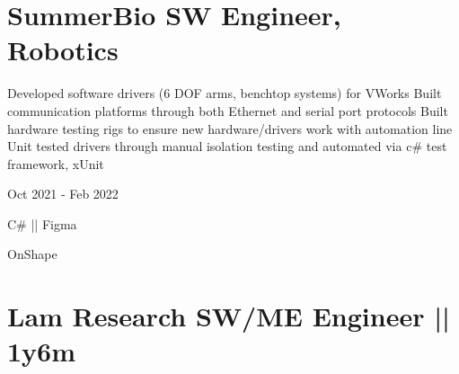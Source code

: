 \section
{\textbf{SummerBio} \newline
SW Engineer, Robotics}{}

\vspace{-2.5ex}
\begin{detail}
    \BulletItem
    Developed software drivers (6 DOF arms, benchtop systems) for VWorks
    \BulletItem
    Built communication platforms through both Ethernet and serial port protocols
    \BulletItem
    Built hardware testing rigs to ensure new hardware/drivers work with automation line
    \BulletItem
    Unit tested drivers through manual isolation testing and automated via c\# test framework, xUnit
\end{detail}

\begin{subtitle}
    \vspace{-13.0ex}
    {{Oct 2021 - Feb 2022}}
\end{subtitle}

{\vspace{4.5ex} \color{cyan}\small {C\# || Figma}}

{
\vspace{-2.5ex}\hspace{3.17in} \color{cyan} \small
{OnShape} }
\vspace{3ex}


\section
{\textbf{Lam Research} \newline
SW/ME Engineer || 1y6m}{}

